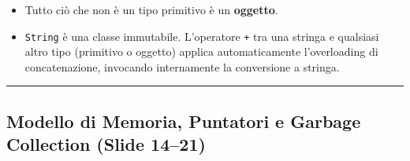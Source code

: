\documentclass[11pt,a4paper,oneside]{report}
\newcommand{\passthrough}[1]{#1}
\providecommand{\tightlist}{\setlength{\itemsep}{0pt}\setlength{\parskip}{0pt}}
\begin{document}
\begin{itemize}
  \begin{itemize}
  \tightlist
  \item
    Tutto ciò che non è un tipo primitivo è un \textbf{oggetto}.
  \item
    \passthrough{\lstinline!String!} è una classe immutabile.
    L'operatore \passthrough{\lstinline!+!} tra una stringa e qualsiasi
    altro tipo (primitivo o oggetto) applica automaticamente
    l'overloading di concatenazione, invocando internamente la
    conversione a stringa.
  \end{itemize}
\end{itemize}

\begin{center}\rule{0.5\linewidth}{0.5pt}\end{center}

\subsection{Modello di Memoria, Puntatori e Garbage Collection (Slide
14--21)}\label{chap04_modello-di-memoria-puntatori-e-garbage-collection-slide-1421}
\end{document}

